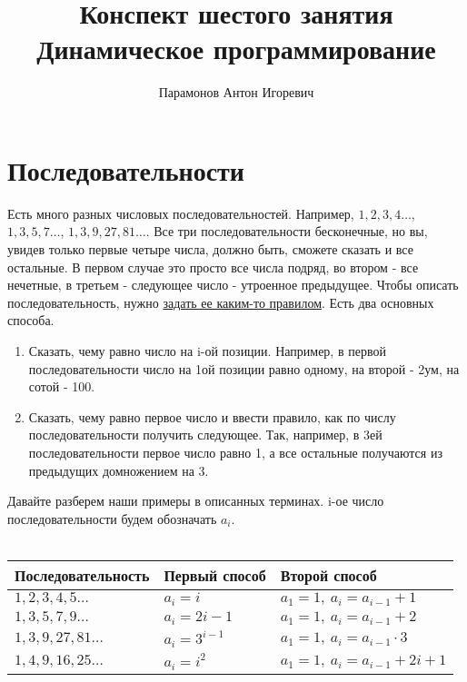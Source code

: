 \documentclass[12pt]{article} %
\begin{document}
\title{Конспект шестого занятия\\
	\large Динамическое программирование}
\author{Парамонов Антон Игоревич}
\maketitle
\section{Последовательности}
Есть много разных числовых последовательностей. Например, $1, 2, 3, 4\ldots$, $1, 3, 5, 7\ldots$, $1, 3, 9, 27, 81\ldots$. Все три последовательности бесконечные, но вы, увидев только первые четыре числа, должно быть, сможете сказать и все остальные. В первом случае это просто все числа подряд, во втором - все нечетные, в третьем - следующее число - утроенное предыдущее. Чтобы описать последовательность, нужно \underline{задать ее каким-то правилом}. Есть два основных способа.
\begin{enumerate}
	\item Сказать, чему равно число на i-ой позиции. Например, в первой последовательности число на 1ой позиции равно одному, на второй - 2ум, на сотой - 100.
	\item Сказать, чему равно первое число и ввести правило, как по числу последовательности получить следующее. Так, например, в 3ей последовательности первое число равно 1, а все остальные получаются из предыдущих домножением на 3.
\end{enumerate} 
Давайте разберем наши примеры в описанных терминах. i-ое число последовательности будем обозначать $a_i$. \\
\\
\begin{tabular}{|l|l|l|}
	\hline
	Последовательность & Первый способ & Второй способ \\
	\hline 
	\hline
	$1, 2, 3, 4, 5\ldots$ & $a_i = i$ & $ a_1 = 1, \ a_{i} = a_{i -1} + 1$\\
	\hline
	$1, 3, 5, 7, 9\ldots$ & $a_i = 2i - 1$ & $a_1 = 1, \ a_{i} = a_{i -1} + 2$\\
	\hline
	$1, 3, 9, 27, 81\ldots$ & $a_i = 3^{i - 1}$ & $a_1 = 1, \ a_{i} = a_{i -1} \cdot 3$\\
	\hline
	$1, 4, 9, 16, 25\ldots$ & $a_i = i^2 $ & $a_1 = 1, \ a_{i} = a_{i -1} + 2i + 1$\\
	\hline
\end{tabular}
\end{document}
